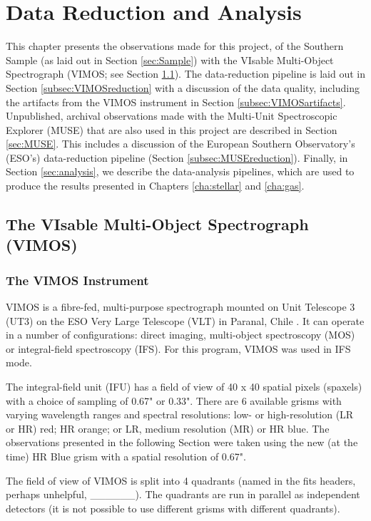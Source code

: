 \chapter{Data Reduction and Analysis}
	\label{cha:Data}
This chapter presents the observations made for this project, of the Southern Sample (as laid out in Section \ref{sec:Sample}) with the VIsable Multi-Object Spectrograph (VIMOS; see Section \ref{sec:VIMOS}). The data-reduction pipeline is laid out in Section \ref{subsec:VIMOSreduction} with a discussion of the data quality, including the artifacts from the VIMOS instrument in Section \ref{subsec:VIMOSartifacts}. Unpublished, archival observations made with the Multi-Unit Spectroscopic Explorer (MUSE) that are also used in this project are described in Section \ref{sec:MUSE}. This includes a discussion of the European Southern Observatory's (ESO's) data-reduction pipeline (Section \ref{subsec:MUSEreduction}). Finally, in Section \ref{sec:analysis}, we describe the data-analysis pipelines, which are used to produce the results presented in Chapters \ref{cha:stellar} and \ref{cha:gas}.  

\section{The VIsable Multi-Object Spectrograph (VIMOS)}
	\label{sec:VIMOS}
	\subsection{The VIMOS Instrument}
		VIMOS is a fibre-fed, multi-purpose spectrograph mounted on Unit Telescope 3 (UT3) on the ESO Very Large Telescope (VLT) in Paranal, Chile \citep{LeFevre2003}. It can operate in a number of configurations: direct imaging, multi-object spectroscopy (MOS) or integral-field spectroscopy (IFS). For this program, VIMOS was used in IFS mode. 

		The integral-field unit (IFU) has a field of view of 40 x 40 spatial pixels (spaxels) with a choice of sampling of 0.67" or 0.33". There are 6 available grisms with varying wavelength ranges and spectral resolutions: low- or high-resolution (LR or HR) red; HR orange; or LR, medium resolution (MR) or HR blue. The observations presented in the following Section were taken using the new (at the time) HR Blue grism with a spatial resolution of 0.67". 

		The field of view of VIMOS is split into 4 quadrants (named in the fits headers, perhaps unhelpful, \_\_\_\_\_\_). The quadrants are run in parallel as independent detectors (it is not possible to use different grisms with different quadrants). %

